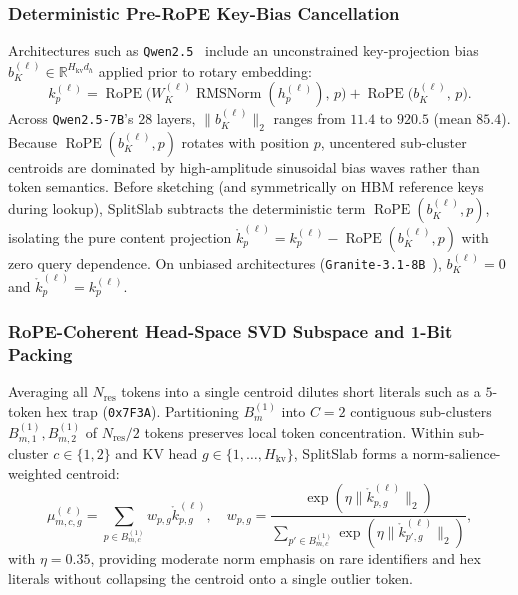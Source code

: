 \documentclass[final,5p,times,twocolumn]{elsarticle}
\theoremstyle{definition}
\theoremstyle{remark}
\newcommand{\SplitSlab}{\textup{\textsc{SplitSlab}}}
\newcommand{\RMSNorm}{\operatorname{RMSNorm}}
\newcommand{\RoPE}{\operatorname{RoPE}}
\newcommand{\R}{\mathbb{R}}
\def\SplitSlab{SplitSlab}%
\begin{document}
\subsubsection{Deterministic Pre-RoPE Key-Bias Cancellation}
Architectures such as \texttt{Qwen2.5}~\cite{yang2024qwen25} include an unconstrained key-projection bias $b_K^{(\ell)} \in \R^{H_{\mathrm{kv}} d_h}$ applied prior to rotary embedding:
\begin{equation}\label{eq:kbias}
k_p^{(\ell)} = \RoPE\!\big(W_K^{(\ell)} \RMSNorm(h_p^{(\ell)}),\, p\big) + \RoPE\!\big(b_K^{(\ell)},\, p\big).
\end{equation}
Across \texttt{Qwen2.5-7B}'s $28$ layers, $\|b_K^{(\ell)}\|_2$ ranges from $11.4$ to $920.5$ (mean $85.4$). Because $\RoPE(b_K^{(\ell)}, p)$ rotates with position $p$, uncentered sub-cluster centroids are dominated by high-amplitude sinusoidal bias waves rather than token semantics. Before sketching (and symmetrically on HBM reference keys during lookup), \SplitSlab{} subtracts the deterministic term $\RoPE(b_K^{(\ell)}, p)$, isolating the pure content projection $\mathring{k}_p^{(\ell)} = k_p^{(\ell)} - \RoPE(b_K^{(\ell)}, p)$ with zero query dependence. On unbiased architectures (\texttt{Granite-3.1-8B}~\cite{mishra2024granite}), $b_K^{(\ell)} = 0$ and $\mathring{k}_p^{(\ell)} = k_p^{(\ell)}$.

\subsubsection{RoPE-Coherent Head-Space SVD Subspace and 1-Bit Packing}
Averaging all $N_{\mathrm{res}}$ tokens into a single centroid dilutes short literals such as a $5$-token hex trap (\texttt{0x7F3A}). Partitioning $B_m^{(1)}$ into $C = 2$ contiguous sub-clusters $B_{m,1}^{(1)}, B_{m,2}^{(1)}$ of $N_{\mathrm{res}}/2$ tokens preserves local token concentration. Within sub-cluster $c \in \{1,2\}$ and KV head $g \in \{1,\dots,H_{\mathrm{kv}}\}$, \SplitSlab{} forms a norm-salience-weighted centroid:
\begin{equation}\label{eq:centroid}
\mu_{m,c,g}^{(\ell)} = \sum_{p \in B_{m,c}^{(1)}} w_{p,g} \mathring{k}_{p,g}^{(\ell)}, \quad
w_{p,g} = \frac{\exp(\eta \|\mathring{k}_{p,g}^{(\ell)}\|_2)}{\sum_{p' \in B_{m,c}^{(1)}} \exp(\eta \|\mathring{k}_{p',g}^{(\ell)}\|_2)},
\end{equation}
with $\eta = 0.35$, providing moderate norm emphasis on rare identifiers and hex literals without collapsing the centroid onto a single outlier token.
\end{document}
